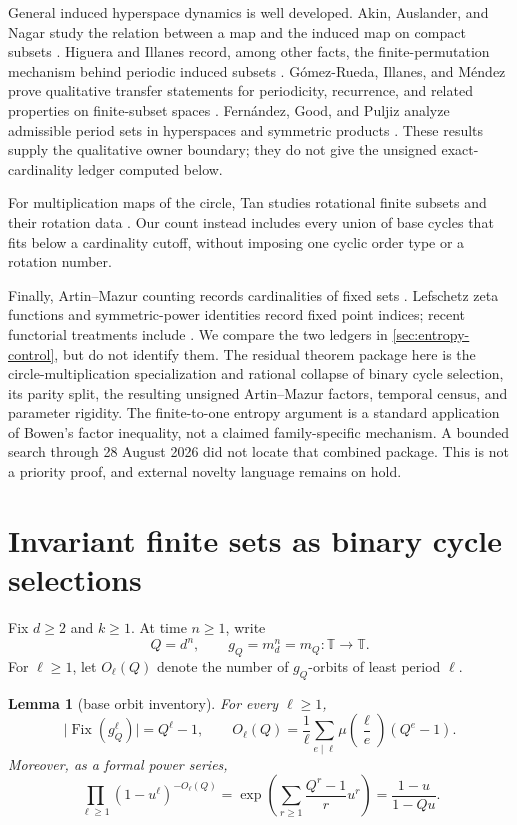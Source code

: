 \documentclass[11pt,a4paper]{amsart}
\newtheorem{lemma}[theorem]{Lemma}
\theoremstyle{definition}
\theoremstyle{remark}
\newcommand{\T}{\mathbb T}
\newcommand{\Fix}{\operatorname{Fix}}
\newcommand{\card}[1]{\lvert #1\rvert}
\newcommand{\mob}{\mu}
\begin{document}
General induced hyperspace dynamics is well developed.  Akin, Auslander,
and Nagar study the relation between a map and the induced map on compact
subsets \cite{AkinAuslanderNagar2017}.  Higuera and Illanes record, among
other facts, the finite-permutation mechanism behind periodic induced
subsets \cite{HigueraIllanes2011}.  G\'omez-Rueda, Illanes, and M\'endez
prove qualitative transfer statements for periodicity, recurrence, and
related properties on finite-subset spaces
\cite{GomezRuedaIllanesMendez2012}.  Fern\'andez, Good, and Puljiz analyze
admissible period sets in hyperspaces and symmetric products
\cite{FernandezGoodPuljiz2018}.  These results supply the qualitative owner
boundary; they do not give the unsigned exact-cardinality ledger computed
below.

For multiplication maps of the circle, Tan studies rotational finite subsets
and their rotation data \cite{Tan2024}.  Our count instead includes every
union of base cycles that fits below a cardinality cutoff, without imposing
one cyclic order type or a rotation number.

Finally, Artin--Mazur counting records cardinalities of fixed sets
\cite{ArtinMazur1965}.  Lefschetz zeta functions and symmetric-power
identities record fixed point indices; recent functorial treatments include
\cite{BlancoGomezEtAl2016,Crabb2025}.  We compare the two ledgers in
\cref{sec:entropy-control}, but do not identify them.  The residual theorem
package here is the circle-multiplication specialization and rational collapse
of binary cycle selection, its parity split, the resulting unsigned
Artin--Mazur factors, temporal census, and parameter rigidity.  The
finite-to-one entropy argument is a standard application of Bowen's factor
inequality, not a claimed family-specific mechanism.  A bounded search through 28 August
2026 did not locate that combined package.  This is not a priority proof,
and external novelty language remains on hold.

\section{Invariant finite sets as binary cycle selections}

Fix $d\geq2$ and $k\geq1$.  At time $n\geq1$, write
\[
 Q=d^n,
 \qquad g_Q=m_d^n=m_Q:\T\longrightarrow\T.
\]
For $\ell\geq1$, let $O_\ell(Q)$ denote the number of $g_Q$-orbits of
least period $\ell$.

\begin{lemma}[base orbit inventory]\label{lem:base}
For every $\ell\geq1$,
\begin{equation}\label{eq:base-orbits}
 \card{\Fix(g_Q^\ell)}=Q^\ell-1,
 \qquad
 O_\ell(Q)=\frac1\ell\sum_{e\mid\ell}
 \mob\!\left(\frac{\ell}{e}\right)(Q^e-1).
\end{equation}
Moreover, as a formal power series,
\begin{equation}\label{eq:base-zeta}
 \prod_{\ell\geq1}(1-u^\ell)^{-O_\ell(Q)}
 =\exp\!\left(\sum_{r\geq1}\frac{Q^r-1}{r}u^r\right)
 =\frac{1-u}{1-Qu}.
\end{equation}
\end{lemma}
\end{document}
